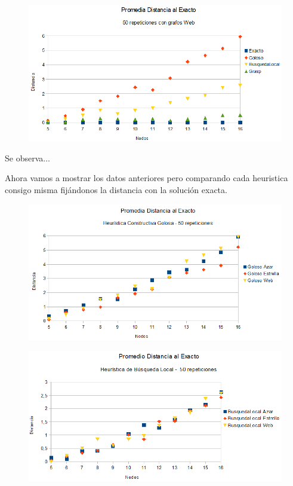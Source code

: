 \begin{figure}[H]
	\centering
	\includegraphics[scale=0.6]{distancia-Web.png}
\end{figure}

\quad Se observa...

\quad

\quad Ahora vamos a mostrar los datos anteriores pero comparando cada heuristica consigo misma fijándonos la distancia con la solución exacta.

\begin{figure}[H]
	\centering
	\includegraphics[scale=0.6]{distancia-Goloso.png}
\end{figure}

\begin{figure}[H]
	\centering
	\includegraphics[scale=0.6]{distancia-BLocal.png}
\end{figure}

